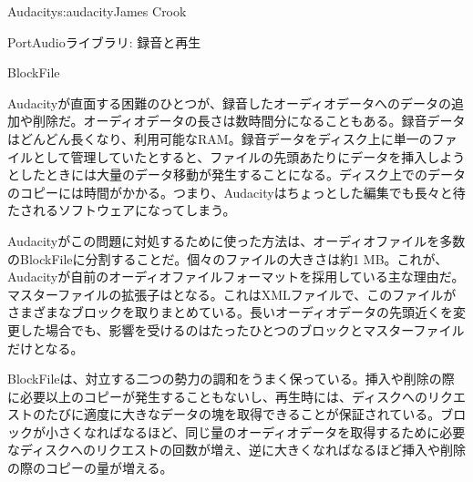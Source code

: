\begin{aosachapter}{Audacity}{s:audacity}{James Crook}
\begin{aosasect1}{PortAudioライブラリ: 録音と再生}
\end{aosasect1}

\begin{aosasect1}{BlockFile}

Audacityが直面する困難のひとつが、録音したオーディオデータへのデータの追加や削除だ。オーディオデータの長さは数時間分になることもある。録音データはどんどん長くなり、利用可能なRAM。録音データをディスク上に単一のファイルとして管理していたとすると、ファイルの先頭あたりにデータを挿入しようとしたときには大量のデータ移動が発生することになる。ディスク上でのデータのコピーには時間がかかる。つまり、Audacityはちょっとした編集でも長々と待たされるソフトウェアになってしまう。

Audacityがこの問題に対処するために使った方法は、オーディオファイルを多数のBlockFileに分割することだ。個々のファイルの大きさは約1 MB。これが、Audacityが自前のオーディオファイルフォーマットを採用している主な理由だ。マスターファイルの拡張子はとなる。これはXMLファイルで、このファイルがさまざまなブロックを取りまとめている。長いオーディオデータの先頭近くを変更した場合でも、影響を受けるのはたったひとつのブロックとマスターファイルだけとなる。

BlockFileは、対立する二つの勢力の調和をうまく保っている。挿入や削除の際に必要以上のコピーが発生することもないし、再生時には、ディスクへのリクエストのたびに適度に大きなデータの塊を取得できることが保証されている。ブロックが小さくなればなるほど、同じ量のオーディオデータを取得するために必要なディスクへのリクエストの回数が増え、逆に大きくなればなるほど挿入や削除の際のコピーの量が増える。


\end{aosasect1}
\end{aosachapter}
